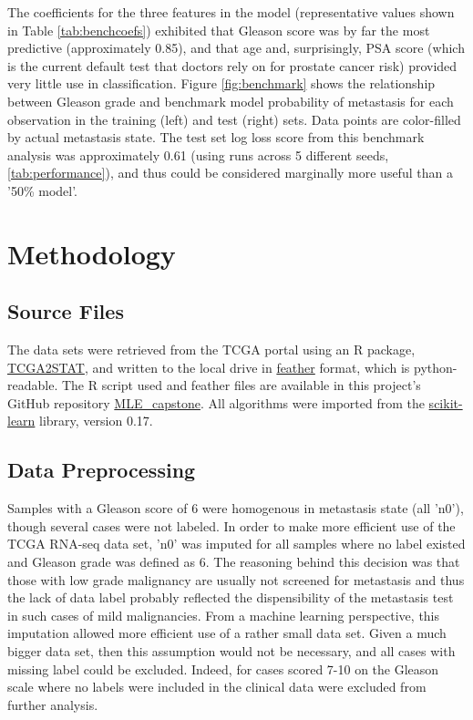 \documentclass[final]{article}
\begin{document}
The coefficients for the three features in the model (representative values
shown in Table \ref{tab:benchcoefs}) exhibited that Gleason score was by far the
most predictive (approximately 0.85), and that age and, surprisingly, PSA score
(which is the current default test that doctors rely on for prostate cancer
risk)  provided very little use in classification.  Figure \ref{fig:benchmark}
shows the relationship between Gleason grade and benchmark model probability of
metastasis for each observation in the training (left) and test (right) sets.
Data points are color-filled by actual metastasis state.  The test set log loss
score from this benchmark analysis was approximately 0.61 (using runs across
5 different seeds, \ref{tab:performance}), and thus could be considered
marginally more useful than a '50\% model'.


\section{Methodology}

\subsection{Source Files}

The data sets were retrieved from the TCGA portal using an R package,
\href{https://cran.r-project.org/web/packages/TCGA2STAT/index.html}{TCGA2STAT},
and written to the local drive in \href{https://github.com/wesm/feather}{feather} format,
which is python-readable.  The R script used and feather files are
available in this project's GitHub repository
\href{https://github.com/CCThompson82/MLE\_capstone}{MLE\_capstone}.  All
algorithms were imported from the
\href{http://scikit-learn.org/stable/}{scikit-learn} library, version 0.17.

\subsection{Data Preprocessing}

Samples with a Gleason score of 6 were homogenous in metastasis state (all
'n0'), though several cases were not labeled.  In order to make more efficient use
of the  TCGA RNA-seq data set, 'n0' was imputed for all samples where no label
existed and  Gleason grade was defined as 6.  The reasoning behind this decision
was that those with low grade malignancy are usually not screened for
metastasis and thus the lack of data label probably reflected the
dispensibility of the metastasis test in such cases of mild malignancies. From a
machine learning perspective, this imputation allowed more efficient use of a rather
small data set.  Given a much bigger data set, then this assumption would not be
necessary, and  all cases with missing label could be excluded.  Indeed, for
cases scored 7-10 on the Gleason scale where no labels were included in the
clinical data were excluded from further analysis.
\end{document}
